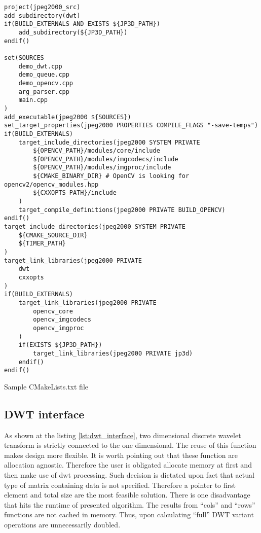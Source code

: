 \begin{listing}[!htb]
\begin{verbatim}
project(jpeg2000_src)
add_subdirectory(dwt)
if(BUILD_EXTERNALS AND EXISTS ${JP3D_PATH})
    add_subdirectory(${JP3D_PATH})
endif()

set(SOURCES
    demo_dwt.cpp
    demo_queue.cpp
    demo_opencv.cpp
    arg_parser.cpp
    main.cpp
)
add_executable(jpeg2000 ${SOURCES})
set_target_properties(jpeg2000 PROPERTIES COMPILE_FLAGS "-save-temps")
if(BUILD_EXTERNALS)
    target_include_directories(jpeg2000 SYSTEM PRIVATE
        ${OPENCV_PATH}/modules/core/include
        ${OPENCV_PATH}/modules/imgcodecs/include
        ${OPENCV_PATH}/modules/imgproc/include
        ${CMAKE_BINARY_DIR} # OpenCV is looking for opencv2/opencv_modules.hpp
        ${CXXOPTS_PATH}/include
    )
    target_compile_definitions(jpeg2000 PRIVATE BUILD_OPENCV)
endif()
target_include_directories(jpeg2000 SYSTEM PRIVATE
    ${CMAKE_SOURCE_DIR}
    ${TIMER_PATH}
)
target_link_libraries(jpeg2000 PRIVATE
    dwt
    cxxopts
)
if(BUILD_EXTERNALS)
    target_link_libraries(jpeg2000 PRIVATE
        opencv_core
        opencv_imgcodecs
        opencv_imgproc
    )
    if(EXISTS ${JP3D_PATH})
        target_link_libraries(jpeg2000 PRIVATE jp3d)
    endif()
endif()
\end{verbatim}
\caption{Sample CMakeLists.txt file}
\label{lst:sample_cmake_file}
\end{listing}

\subsection{DWT interface}

As shown at the listing \ref{lst:dwt_interface}, two dimensional discrete wavelet transform
is strictly connected to the one dimensional. The reuse of this function makes design more
flexible. It is worth pointing out that these function are allocation agnostic. Therefore
the user is obligated allocate memory at first and then make use of dwt processing. Such
decision is dictated upon fact that actual type of matrix containing data is not specified.
Therefore a pointer to first element and total size are the most feasible solution.
There is one disadvantage that hits the runtime of presented algorithm. The results
from ``cols'' and ``rows'' functions are not cached in memory. Thus, upon calculating
``full'' DWT variant operations are unnecessarily doubled.

